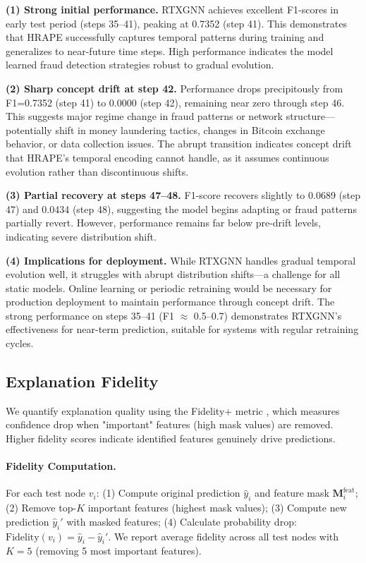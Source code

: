 \textbf{(1) Strong initial performance.} RTXGNN achieves excellent F1-scores in early test period (steps 35--41), peaking at 0.7352 (step 41). This demonstrates that HRAPE successfully captures temporal patterns during training and generalizes to near-future time steps. High performance indicates the model learned fraud detection strategies robust to gradual evolution.

\textbf{(2) Sharp concept drift at step 42.} Performance drops precipitously from F1=0.7352 (step 41) to 0.0000 (step 42), remaining near zero through step 46. This suggests major regime change in fraud patterns or network structure—potentially shift in money laundering tactics, changes in Bitcoin exchange behavior, or data collection issues. The abrupt transition indicates concept drift that HRAPE's temporal encoding cannot handle, as it assumes continuous evolution rather than discontinuous shifts.

\textbf{(3) Partial recovery at steps 47--48.} F1-score recovers slightly to 0.0689 (step 47) and 0.0434 (step 48), suggesting the model begins adapting or fraud patterns partially revert. However, performance remains far below pre-drift levels, indicating severe distribution shift.

\textbf{(4) Implications for deployment.} While RTXGNN handles gradual temporal evolution well, it struggles with abrupt distribution shifts—a challenge for all static models. Online learning or periodic retraining would be necessary for production deployment to maintain performance through concept drift. The strong performance on steps 35--41 (F1 $\approx$ 0.5--0.7) demonstrates RTXGNN's effectiveness for near-term prediction, suitable for systems with regular retraining cycles.

\subsection{Explanation Fidelity}
\label{subsec:explanation_fidelity}

We quantify explanation quality using the Fidelity+ metric \citep{yuan2021subgraphx}, which measures confidence drop when "important" features (high mask values) are removed. Higher fidelity scores indicate identified features genuinely drive predictions.

\paragraph{Fidelity Computation.} For each test node $v_i$: (1) Compute original prediction $\hat{y}_i$ and feature mask $\mathbf{M}^{\text{feat}}_i$; (2) Remove top-$K$ important features (highest mask values); (3) Compute new prediction $\hat{y}_i'$ with masked features; (4) Calculate probability drop: $\text{Fidelity}(v_i) = \hat{y}_i - \hat{y}_i'$. We report average fidelity across all test nodes with $K=5$ (removing 5 most important features).

